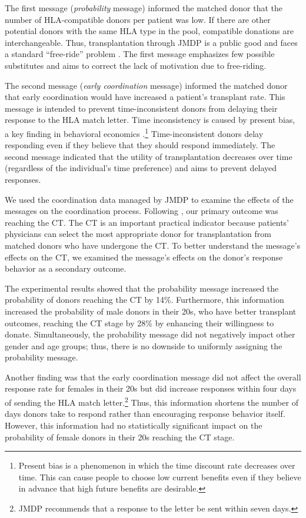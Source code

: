 \documentclass [12pt, a4paper]{article}
\begin{document}
The first message (\emph{probability} message) informed the matched donor that the number of HLA-compatible donors per patient was low. If there are other potential donors with the same HLA type in the pool, compatible donations are interchangeable. Thus, transplantation through JMDP is a public good and faces a standard ``free-ride'' problem \citep{Bergstrom2009}. The first message emphasizes few possible substitutes and aims to correct the lack of motivation due to free-riding.

The second message (\emph{early coordination} message) informed the matched donor that early coordination would have increased a patient's transplant rate. This message is intended to prevent time-inconsistent donors from delaying their response to the HLA match letter. Time inconsistency is caused by present bias, a key finding in behavioral economics \citep{Laibson1997, ODonoghue2001}.\footnote{Present bias is a phenomenon in which the time discount rate decreases over time. This can cause people to choose low current benefits even if they believe in advance that high future benefits are desirable.} Time-inconsistent donors delay responding even if they believe that they should respond immediately. The second message indicated that the utility of transplantation decreases over time (regardless of the individual's time preference) and aims to prevent delayed responses.

We used the coordination data managed by JMDP to examine the effects of the messages on the coordination process. Following \citep{Haylock2024}, our primary outcome was reaching the CT. The CT is an important practical indicator because patients' physicians can select the most appropriate donor for transplantation from matched donors who have undergone the CT. To better understand the message's effects on the CT, we examined the message's effects on the donor's response behavior as a secondary outcome.

The experimental results showed that the probability message increased the probability of donors reaching the CT by 14\%. Furthermore, this information increased the probability of male donors in their 20s, who have better transplant outcomes, reaching the CT stage by 28\% by enhancing their willingness to donate. Simultaneously, the probability message did not negatively impact other gender and age groups; thus, there is no downside to uniformly assigning the probability message.

Another finding was that the early coordination message did not affect the overall response rate for females in their 20s but did increase responses within four days of sending the HLA match letter.\footnote{JMDP recommends that a response to the letter be sent within seven days.} Thus, this information shortens the number of days donors take to respond rather than encouraging response behavior itself. However, this information had no statistically significant impact on the probability of female donors in their 20s reaching the CT stage.
\end{document}
